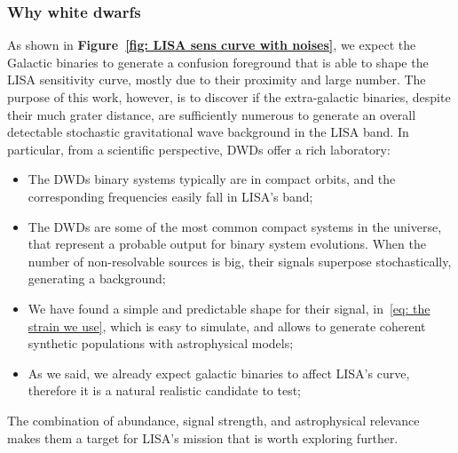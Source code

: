 \subsubsection{Why white dwarfs}
As shown in \textbf{Figure~\ref{fig: LISA sens curve with noises}}, we expect the Galactic binaries to generate a confusion foreground that is able to shape the LISA sensitivity curve, mostly due to their proximity and large number.
The purpose of this work, however, is to discover if the extra-galactic binaries, despite their much grater distance, are sufficiently numerous to generate an overall detectable stochastic gravitational wave background in the LISA band.
In particular, from a scientific perspective, DWDs offer a rich laboratory:  
\begin{itemize}
    \item The DWDs binary systems typically are in compact orbits, and the corresponding frequencies easily fall in LISA's band; 
    \item The DWDs are some of the most common compact systems in the universe, that represent a probable output for binary system evolutions. 
    When the number of non-resolvable sources is big, their signals superpose stochastically, generating a background; 
    \item We have found a simple and predictable shape for their signal, in~\eqref{eq: the strain we use}, which is easy to simulate, and allows to generate coherent synthetic populations with astrophysical models; 
    \item As we said, we already expect galactic binaries to affect LISA's curve, therefore it is a natural realistic candidate to test;
\end{itemize}
The combination of abundance, signal strength, and astrophysical relevance makes them a target for LISA’s mission that is worth exploring further.

